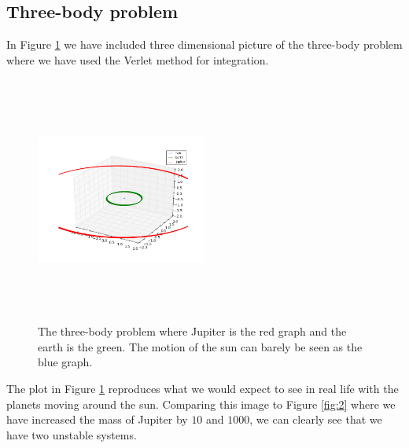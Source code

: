\documentclass[%
 reprint,
 nobalance,
 amsmath,amssymb,
 aps,
]{revtex4-1}
\begin{document}
\subsection{\label{sec:Sub2}Three-body problem}

In Figure \ref{fig:plot/earth_sun_jupiter_mj1.png} we have included three dimensional picture of the three-body problem where we have used the Verlet method for integration.

\begin{figure}[H]
\centering
\includegraphics[height=3.2in, width=0.5\textwidth]{plot/earth_sun_jupiter_mj1.png} \caption{The three-body problem where Jupiter is the red graph and the earth is the green. The motion of the sun can barely be seen as the blue graph.}\label{fig:plot/earth_sun_jupiter_mj1.png}
\end{figure}

The plot in Figure \ref{fig:plot/earth_sun_jupiter_mj1.png} reproduces what we would expect to see in real life with the planets moving around the sun. Comparing this image to Figure \ref{fig:2} where we have increased the mass of Jupiter by $10$ and $1000$, we can clearly see that we have two unstable systems.
\end{document}

